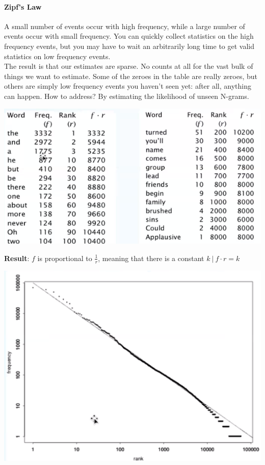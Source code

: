 \documentclass[10pt]{report}
\begin{document}
\paragraph{Zipf's Law} A small number of events occur with high frequency, while a large number of events occur with small frequency. You can quickly collect statistics on the high frequency events, but you may have to wait an arbitrarily long time to get valid statistics on low frequency events.\\
The result is that our estimates are sparse. No counts at all for the vast bulk of things we want to estimate. Some of the zeroes in the table are really zeroes, but others are simply low frequency events you haven't seen yet: after all, anything can happen. How to address? By estimating the likelihood of unseen N-grams.
\begin{center}
	\includegraphics[scale=0.75]{1.png}
\end{center}
\textbf{Result}: $f$ is proportional to $\frac{1}{r}$, meaning that there is a constant $k\:|\:f\cdot r = k$
\begin{center}
	\includegraphics[scale=0.75]{2.png}
\end{center}
\end{document}
